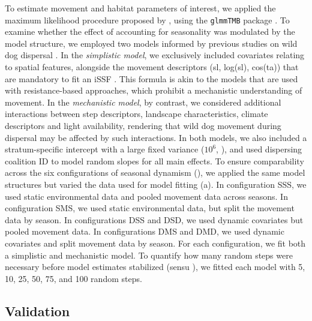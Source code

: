 \documentclass[abstract=on,10pt,a4paper,bibliography=totocnumbered]{article}
\begin{document}
To estimate movement and habitat parameters of interest, we applied the maximum
likelihood procedure proposed by \citet{Muff.2020}, using the \texttt{glmmTMB}
package \citep{Brooks.2017}. To examine whether the effect of accounting for
seasonality was modulated by the model structure, we employed two models
informed by previous studies on wild dog dispersal \citep{Hofmann.2021,
Hofmann.2023}. In the \textit{simplistic model}, we exclusively included
covariates relating to spatial features, alongside the movement descriptors (sl,
log(sl), cos(ta)) that are mandatory to fit an iSSF \citep{Avgar.2017,
Fieberg.2021}. This formula is akin to the models that are used with
resistance-based approaches, which prohibit a mechanistic understanding of
movement. In the \textit{mechanistic model}, by contrast, we considered
additional interactions between step descriptors, landscape characteristics,
climate descriptors and light availability, rendering that wild dog movement
during dispersal may be affected by such interactions. In both models, we also
included a stratum-specific intercept with a large fixed variance ($10^6$,
\citealp{Muff.2020}), and used dispersing coalition ID to model random slopes
for all main effects. To ensure comparability across the six configurations of
seasonal dynamism (), we applied the same model
structures but varied the data used for model fitting
(a). In configuration SSS, we used static
environmental data and pooled movement data across seasons. In configuration
SMS, we used static environmental data, but split the movement data by season.
In configurations DSS and DSD, we used dynamic covariates but pooled movement
data. In configurations DMS and DMD, we used dynamic covariates and split
movement data by season. For each configuration, we fit both a simplistic and
mechanistic model. To quantify how many random steps were necessary before model
estimates stabilized (sensu \citealp{Fieberg.2021}), we fitted each model with
5, 10, 25, 50, 75, and 100 random steps.

\subsection{Validation}
\end{document}
